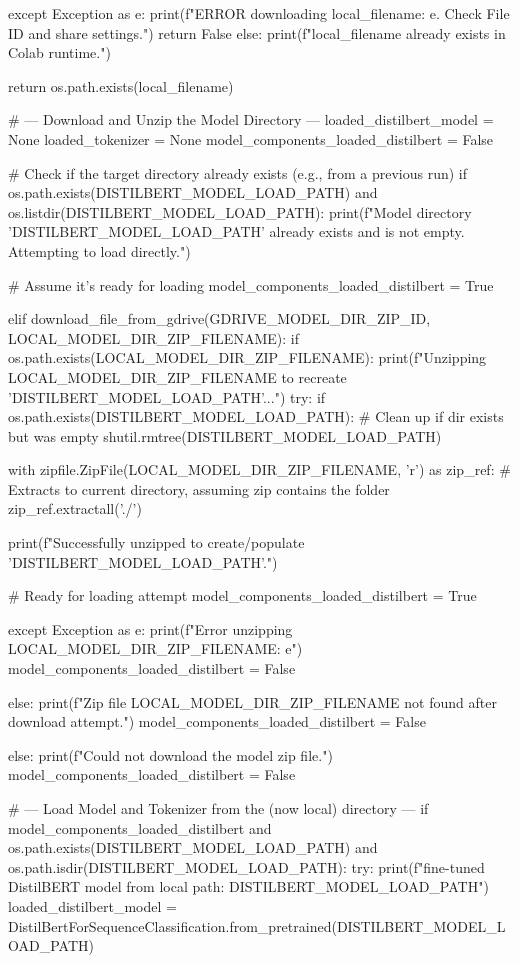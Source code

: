 \begin{ffcode}
        except Exception as e:
            print(f"ERROR downloading {local_filename}: {e}. Check File ID and share settings.")
            return False
    else:
        print(f"{local_filename} already exists in Colab runtime.")

    return os.path.exists(local_filename)

# --- Download and Unzip the Model Directory ---
loaded_distilbert_model = None
loaded_tokenizer = None
model_components_loaded_distilbert = False

# Check if the target directory already exists (e.g., from a previous run)
if os.path.exists(DISTILBERT_MODEL_LOAD_PATH) and os.listdir(DISTILBERT_MODEL_LOAD_PATH):
    print(f"Model directory '{DISTILBERT_MODEL_LOAD_PATH}' already exists and is not empty. Attempting to load directly.")

    # Assume it's ready for loading
    model_components_loaded_distilbert = True

elif download_file_from_gdrive(GDRIVE_MODEL_DIR_ZIP_ID, LOCAL_MODEL_DIR_ZIP_FILENAME):
    if os.path.exists(LOCAL_MODEL_DIR_ZIP_FILENAME):
        print(f"Unzipping {LOCAL_MODEL_DIR_ZIP_FILENAME} to recreate '{DISTILBERT_MODEL_LOAD_PATH}'...")
        try:
            if os.path.exists(DISTILBERT_MODEL_LOAD_PATH): # Clean up if dir exists but was empty
                shutil.rmtree(DISTILBERT_MODEL_LOAD_PATH)

            with zipfile.ZipFile(LOCAL_MODEL_DIR_ZIP_FILENAME, 'r') as zip_ref:
                # Extracts to current directory, assuming zip contains the folder
                zip_ref.extractall('./')

            print(f"Successfully unzipped to create/populate '{DISTILBERT_MODEL_LOAD_PATH}'.")

            # Ready for loading attempt
            model_components_loaded_distilbert = True

        except Exception as e:
            print(f"Error unzipping {LOCAL_MODEL_DIR_ZIP_FILENAME}: {e}")
            model_components_loaded_distilbert = False

    else:
        print(f"Zip file {LOCAL_MODEL_DIR_ZIP_FILENAME} not found after download attempt.")
        model_components_loaded_distilbert = False

else:
    print(f"Could not download the model zip file.")
    model_components_loaded_distilbert = False


# --- Load Model and Tokenizer from the (now local) directory ---
if model_components_loaded_distilbert and os.path.exists(DISTILBERT_MODEL_LOAD_PATH) and os.path.isdir(DISTILBERT_MODEL_LOAD_PATH):
    try:
        print(f"\nLoading fine-tuned DistilBERT model from local path: {DISTILBERT_MODEL_LOAD_PATH}")
        loaded_distilbert_model = DistilBertForSequenceClassification.from_pretrained(DISTILBERT_MODEL_LOAD_PATH)


\end{ffcode}
